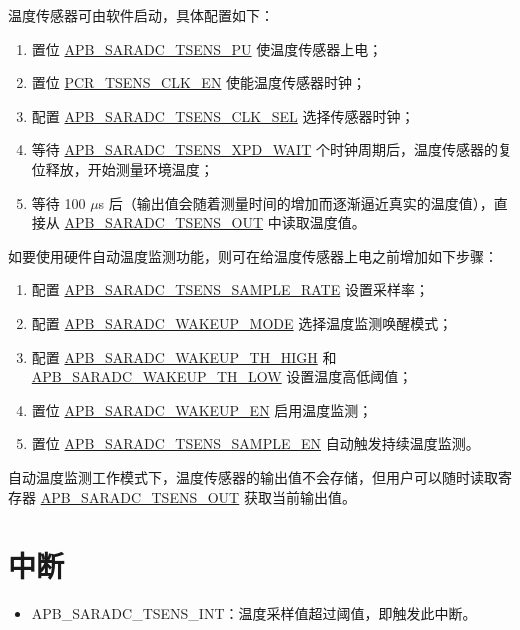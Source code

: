 \documentclass[main\_\_CN.tex]{subfiles}
\begin{document}
温度传感器可由软件启动，具体配置如下：
    \begin{enumerate}
        \item 置位 \hyperref[fielddesc:APBSARADCTSENSPU]{APB\_SARADC\_TSENS\_PU} 使温度传感器上电；
        \item 置位 \hyperref[fielddesc:PCRTSENSCLKEN]{PCR\_TSENS\_CLK\_EN} 使能温度传感器时钟；
        \item 配置 \hyperref[fielddesc:APBSARADCTSENSCLKSEL]{APB\_SARADC\_TSENS\_CLK\_SEL} 选择传感器时钟；
        \item 等待 \hyperref[fielddesc:APBSARADCTSENSXPDWAIT]{APB\_SARADC\_TSENS\_XPD\_WAIT} 个时钟周期后，温度传感器的复位释放，开始测量环境温度；
        \item 等待 100 $\mu$s 后（输出值会随着测量时间的增加而逐渐逼近真实的温度值），直接从 \hyperref[fielddesc:APBSARADCTSENSOUT]{APB\_SARADC\_TSENS\_OUT} 中读取温度值。
    \end{enumerate}
如要使用硬件自动温度监测功能，则可在给温度传感器上电之前增加如下步骤：
    \begin{enumerate}
        \item 配置 \hyperref[fielddesc:APBSARADCTSENSSAMPLERATE]{APB\_SARADC\_TSENS\_SAMPLE\_RATE} 设置采样率；
        \item 配置 \hyperref[fielddesc:APBSARADCWAKEUPMODE]{APB\_SARADC\_WAKEUP\_MODE} 选择温度监测唤醒模式；
        \item 配置 \hyperref[fielddesc:APBSARADCWAKEUPTHHIGH]{APB\_SARADC\_WAKEUP\_TH\_HIGH} 和 \hyperref[fielddesc:APBSARADCWAKEUPTHLOW]{APB\_SARADC\_WAKEUP\_TH\_LOW} 设置温度高低阈值；
        \item 置位 \hyperref[fielddesc:APBSARADCWAKEUPEN]{APB\_SARADC\_WAKEUP\_EN} 启用温度监测；
        \item 置位 \hyperref[fielddesc:APBSARADCTSENSSAMPLEEN]{APB\_SARADC\_TSENS\_SAMPLE\_EN} 自动触发持续温度监测。
    \end{enumerate}

自动温度监测工作模式下，温度传感器的输出值不会存储，但用户可以随时读取寄存器 \hyperref[fielddesc:APBSARADCTSENSOUT]{APB\_SARADC\_TSENS\_OUT} 获取当前输出值。

\section{中断}

\begin{itemize}
    \item \label{int:APBSARADCTSENSINT} APB\_SARADC\_TSENS\_INT：温度采样值超过阈值，即触发此中断。
\end{itemize}
\end{document}
